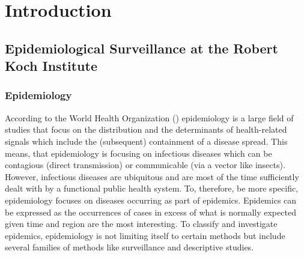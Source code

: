 \chapter{Introduction}
%
%
%


\section{Epidemiological Surveillance at the Robert Koch Institute}

\subsection{Epidemiology}
According to the World Health Organization () \cite{WHOepi} epidemiology is a large field of studies that focus
on the distribution and the determinants of health-related signals which include the (subsequent)
containment of a disease spread. This means, that epidemiology is focusing on infectious diseases which can be contagious (direct transmission) or communicable (via a vector like insects). However, infectious diseases are ubiquitous and are most of the time sufficiently dealt with by a functional public health system. To, therefore, be more specific, epidemiology focuses on diseases occurring as part of epidemics. Epidemics can be expressed as the occurrences of cases in excess of what is normally expected
given time and region are the most interesting. To classify and investigate epidemics, epidemiology is not limiting itself to certain methods but include several families of methods like surveillance and descriptive studies.

